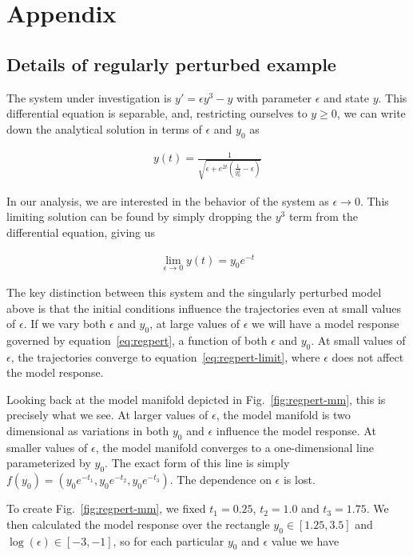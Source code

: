 \chapter{Appendix}

\section{Details of regularly perturbed example \label{app:regpert}}

The system under investigation is $y' = \epsilon y^3 - y$ with
parameter $\epsilon$ and state $y$. This differential equation is
separable, and, restricting ourselves to $y \ge 0$, we can write down
the analytical solution in terms of $\epsilon$ and $y_0$ as

\begin{align}
  y(t) = \frac{1}{\sqrt{\epsilon + e^{2 t} \left(\frac{1}{y_0^2} -
  \epsilon \right)}}
\label{eq:regpert}
\end{align}

In our analysis, we are interested in the behavior of the system as
$\epsilon \rightarrow 0$. This limiting solution can be found by
simply dropping the $y^3$ term from the differential equation, giving
us

\begin{align}
  \lim_{\epsilon \rightarrow 0} y(t) = y_0 e^{-t}
\label{eq:regpert-limit}
\end{align}

The key distinction between this system and the singularly perturbed
model above is that the initial conditions influence the trajectories
even at small values of $\epsilon$. If we vary both $\epsilon$ and
$y_0$, at large values of $\epsilon$ we will have a model response
governed by equation~\ref{eq:regpert}, a function of both $\epsilon$
and $y_0$. At small values of $\epsilon$, the trajectories converge
to equation~\ref{eq:regpert-limit}, where $\epsilon$ does not
affect the model response.

Looking back at the model manifold depicted in
Fig.~\ref{fig:regpert-mm}, this is precisely what we see. At larger
values of $\epsilon$, the model manifold is two dimensional as
variations in both $y_0$ and $\epsilon$ influence the model
response. At smaller values of $\epsilon$, the model manifold
converges to a one-dimensional line parameterized by $y_0$. The exact
form of this line is simply $f(y_0)= \left( y_0 e^{-t_1}, y_0 e^{-t_2}, y_0
  e^{-t_3} \right)$. The dependence on $\epsilon$ is lost.

To create Fig.~\ref{fig:regpert-mm}, we fixed $t_1 = 0.25$,
$t_2 = 1.0$ and $t_3 = 1.75$. We then calculated the model response
over the rectangle $y_0 \in [1.25, 3.5]$ and $\log(\epsilon) \in [-3,
-1]$, so for each particular $y_0$ and $\epsilon$ value we have

